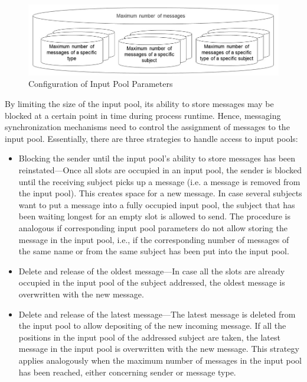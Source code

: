 \begin{figure}[htbp]
	\centering
	\includegraphics[width=12cm]{20181026-Ontologie-Bilder/Grafiken-Ontologie/SUbject-Interaction/input-pool-informal.jpg}
	\caption[Input Pool]{Configuration of Input Pool Parameters}
	\label{fig:input-pool}
\end{figure}

By limiting the size of the input pool, its ability to store messages may be blocked at a certain point in time during process runtime. Hence, messaging synchronization mechanisms need to control the assignment of messages to the input pool. Essentially, there are three strategies to handle access to input pools:

\begin{itemize}
	\item Blocking the sender until the input pool’s ability to store messages has been reinstated---Once all slots are occupied in an input pool, the sender is blocked until the receiving subject picks up a message (i.e. a message is removed from the input pool). This creates space for a new message. In case several subjects want to put a message into a fully occupied input pool, the subject that has been waiting longest for an empty slot is allowed to send. The procedure is analogous if corresponding input pool parameters do not allow storing the message in the input pool, i.e., if the corresponding number of messages of the same name or from the same subject has been put into the input pool.
	\item Delete and release of the oldest message---In case all the slots are already occupied in the input pool of the subject addressed, the oldest message is overwritten with the new message.
	\item Delete and release of the latest message---The latest message is deleted from the input pool to allow depositing of the new incoming message. If all the positions in the input pool of the addressed subject are taken, the latest message in the input pool is overwritten with the new message. This strategy applies analogously when the maximum number of messages in the input pool has been reached, either concerning sender or message type.
\end{itemize}

